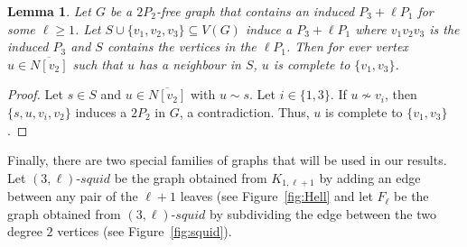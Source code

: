 \documentclass[11pt]{article}
\newtheorem{lemma}[theorem]{Lemma}
\theoremstyle{definition}
\newcommand{\hl}[1]{$(3,#1)$-$squid$}
\begin{document}
\begin{lemma}\label{lem:2P2freeneighboursofS}
Let $G$ be a $2P_2$-free graph that contains an induced $P_3+\ell P_1$ for some $\ell\ge 1$. Let $S\cup\{v_1,v_2,v_3\}\subseteq V(G)$ induce a $P_3+\ell P_1$ where $v_1v_2v_3$ is the induced $P_3$ and $S$ contains the vertices in the $\ell P_1$. Then for ever vertex $u\in \overline{N[v_2]}$ such that $u$ has a neighbour in $S$, $u$ is complete to $\{v_1,v_3\}$. 
\end{lemma}
\begin{proof}
Let $s\in S$ and $u\in \overline{N[v_2]}$ with $u\sim s$. Let $i\in \{1,3\}$. If $u\nsim v_i$, then $\{s,u,v_i,v_2\}$ induces a $2P_2$ in $G$, a contradiction. Thus, $u$ is complete to $\{v_1,v_3\}$.
\end{proof}






Finally, there are two special families of graphs that will be used in our results. Let \hl{\ell} be the graph obtained from $K_{1,\ell+1}$ by adding an edge between any pair of the $\ell+1$ leaves (see Figure~\ref{fig:Hell} and let $F_{\ell}$ be the graph obtained from \hl{\ell} by subdividing the edge between the two degree $2$ vertices (see Figure~\ref{fig:squid}).
\end{document}
